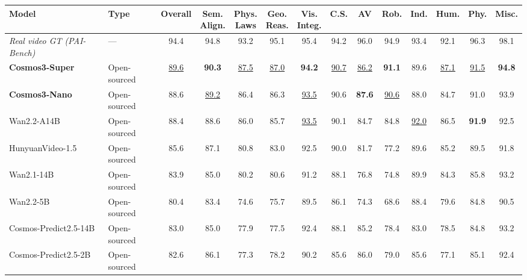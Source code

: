 \documentclass{llmxive}
\providecommand{\arraystretch}{1.5}
\begin{document}
\begin{table}[!htbp]
  \centering
  \footnotesize
  \setlength{\tabcolsep}{3pt}
  \renewcommand{\arraystretch}{1.15}
  \begin{tabular}{l l c cccc | ccccccc}
      \toprule
      \textbf{Model} & \textbf{Type} & \textbf{Overall}
      & \makecell{\textbf{Sem.}\\\textbf{Align.}} & \makecell{\textbf{Phys.}\\\textbf{Laws}} & \makecell{\textbf{Geo.}\\\textbf{Reas.}} & \makecell{\textbf{Vis.}\\\textbf{Integ.}}
      & \textbf{C.S.} & \textbf{AV} & \textbf{Rob.} & \textbf{Ind.} & \textbf{Hum.} & \textbf{Phy.} & \textbf{Misc.} \\
      \midrule
      \rowcolor{black!8}
      \emph{Real video GT (PAI-Bench)} & --- & 94.4 & 94.8 & 93.2 & 95.1 & 95.4 & 94.2 & 96.0 & 94.9 & 93.4 & 92.1 & 96.3 & 98.1 \\
      \midrule
      \rowcolor{rowours}
      \textbf{Cosmos3-Super} & Open-sourced & \underline{89.6} & \textbf{90.3} & \underline{87.5} & \underline{87.0} & \textbf{94.2} & \underline{90.7} & \underline{86.2} &
\textbf{91.1} & 89.6 & \underline{87.1} & \underline{91.5} & \textbf{94.8} \\
      \rowcolor{rowours}
      \textbf{Cosmos3-Nano} & Open-sourced & 88.6 & \underline{89.2} & 86.4 & 86.3 & \underline{93.5} & 90.6 & \textbf{87.6} & \underline{90.6} & 88.0 & 84.7 & 91.0 & 93.9 \\
      \midrule
      Wan2.2-A14B & Open-sourced & 88.4 & 88.6 & 86.0 & 85.7 & \underline{93.5} & 90.1 & 84.7 & 84.8 & \underline{92.0} & 86.5 & \textbf{91.9} & 92.5 \\
      HunyuanVideo-1.5 & Open-sourced & 85.6 & 87.1 & 80.8 & 83.0 & 92.5 & 90.0 & 81.7 & 77.2 & 89.6 & 85.2 & 89.5 & 91.8 \\
      Wan2.1-14B & Open-sourced & 83.9 & 85.0 & 80.2 & 80.6 & 91.2 & 88.1 & 76.8 & 74.8 & 89.9 & 84.3 & 85.8 & 93.2 \\
      Wan2.2-5B & Open-sourced & 80.4 & 83.4 & 74.6 & 75.7 & 89.5 & 86.1 & 74.3 & 68.6 & 88.4 & 79.6 & 84.8 & 90.5 \\
      Cosmos-Predict2.5-14B & Open-sourced & 83.0 & 85.0 & 77.9 & 77.5 & 92.4 & 88.1 & 85.2 & 78.4 & 83.0 & 78.5 & 84.8 & 93.2 \\
      Cosmos-Predict2.5-2B & Open-sourced & 82.6 & 86.1 & 77.3 & 78.2 & 90.2 & 85.6 & 86.0 & 79.0 & 85.6 & 77.1 & 85.1 & 92.4 \\

\end{tabular}
\end{table}
\end{document}
